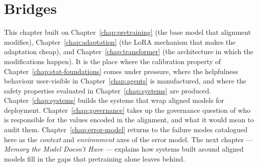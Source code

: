 \section*{Bridges}

This chapter built on Chapter~\ref{chap:pretraining} (the base model that alignment
modifies), Chapter~\ref{chap:adaptation} (the LoRA mechanism that makes the
adaptation cheap), and Chapter~\ref{chap:transformer} (the architecture in which
the modifications happen). It is the place where the
calibration property of Chapter~\ref{chap:stat-foundations} comes under pressure, where
the helpfulness behaviour user-visible in Chapter~\ref{chap:agents} is
manufactured, and where the safety properties evaluated in
Chapter~\ref{chap:systems} are produced. Chapter~\ref{chap:systems} builds the systems that
wrap aligned models for deployment. Chapter~\ref{chap:governance} takes up the
governance question of who is responsible for the values
encoded in the alignment, and what it would mean to audit them.
Chapter~\ref{chap:error-model} returns to the failure modes catalogued here as the
\emph{context} and \emph{environment} axes of the error model.
The next chapter --- \emph{Memory the Model Doesn't Have} ---
explains how systems built around aligned models fill in the
gaps that pretraining alone leaves behind.
